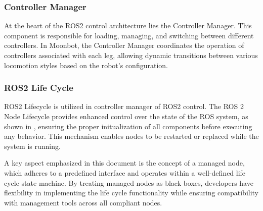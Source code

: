 
\subsubsection{Controller Manager}
At the heart of the ROS2 control architecture lies the Controller Manager. This component is responsible for loading, managing, and switching between different controllers. In Moonbot, the Controller Manager coordinates the operation of controllers associated with each leg, allowing dynamic transitions between various locomotion styles based on the robot's configuration.

\subsubsection{ROS2 Life Cycle}
ROS2 Lifecycle \cite{ros2lifecycle} is utilized in controller manager of ROS2 control. The ROS 2 Node Lifecycle provides enhanced control over the state of the ROS system, as shown in , ensuring the proper initualization of all components before executing any behavior. This mechanism enables nodes to be restarted or replaced while the system is running.

A key aspect emphasized in this document is the concept of a managed node, which adheres to a predefined interface and operates within a well-defined life cycle state machine. By treating managed nodes as black boxes, developers have flexibility in implementing the life cycle functionality while ensuring compatibility with management tools across all compliant nodes.\\

